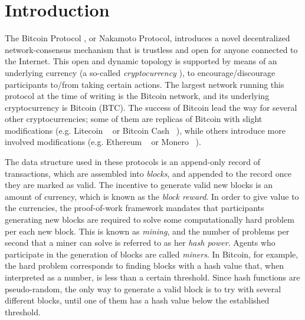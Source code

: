
\section{Introduction}

The Bitcoin Protocol \cite{Bitcoin,DBLP:books/daglib/0040621,NC17}, or Nakamoto Protocol, introduces a novel decentralized network-consensus mechanism that is trustless and open for anyone connected to the Internet. This open and dynamic topology is supported by means of an 
underlying currency (a so-called \emph{cryptocurrency} \cite{NC17}), to encourage/discourage participants to/from taking certain actions. The largest network running this protocol at the time of writing is the Bitcoin network, and its underlying cryptocurrency is Bitcoin (BTC). The success of Bitcoin lead the way for several other cryptocurrencies; some of them 
are replicas of Bitcoin with slight modifications (e.g. Litecoin%
~\cite{Litecoin} 
or Bitcoin Cash%
~\cite{Bcash}), 
while others introduce more involved modifications 
(e.g. Ethereum%
~\cite{Ethereum,E17} 
or Monero%
~\cite{Monero}).

The data structure used in these protocols is an append-only record of transactions, which are assembled into \emph{blocks}, and appended to the record once they 
are marked as valid. The incentive to generate valid new blocks is an amount of currency, which is known as the \emph{block reward}. 
In order to give value to the currencies, the 
proof-of-work framework mandates that participants generating new blocks are required to solve some computationally hard problem per each new block.  This is known as \emph{mining}, and the number of problems per second that a miner can solve is referred to as her \emph{hash power}. Agents who participate in the generation of blocks are called \emph{miners}. In Bitcoin, for example, the hard problem corresponds to finding blocks with a hash value that, when interpreted as a number, is less than a certain threshold. Since hash functions are pseudo-random, the only way to generate a valid block is to try with several different blocks, until one of them has a hash value below the established threshold. 

